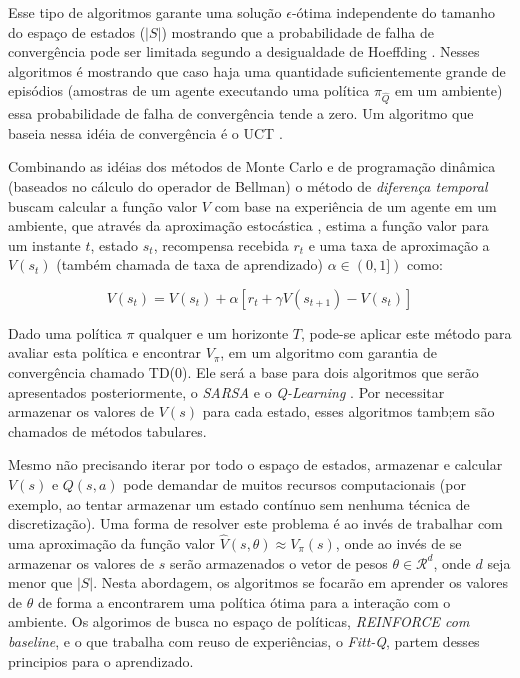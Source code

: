 \documentclass[letterpaper]{article}
\begin{document}

Esse tipo de algoritmos garante uma solução $\epsilon$-ótima independente do tamanho do espaço de estados ($|S|$) mostrando que a probabilidade de falha de convergência pode ser limitada segundo a desigualdade de Hoeffding \cite{Hoeffding-1994}. Nesses algoritmos é mostrando que caso haja uma quantidade suficientemente grande de episódios (amostras de um agente executando uma política $\pi_{\hat{Q}}$ em um ambiente) essa probabilidade de falha de convergência tende a zero. Um algoritmo que baseia nessa idéia de convergência é o UCT \cite{KocsisSzepesv-2006}.

Combinando as idéias dos métodos de Monte Carlo e de programação dinâmica (baseados no cálculo do operador de Bellman) o método de \textit{diferença temporal} buscam calcular a função valor $V$ com base na experiência de um agente em um ambiente, que através da aproximação estocástica \cite{RobbinsMonro-1951}, estima a função valor para um instante $t$, estado $s_t$, recompensa recebida $r_t$ e  uma taxa de aproximação a $V(s_t)$ (também chamada de taxa de aprendizado) $\alpha \in (0, 1])$ como:

\begin{equation} \label{eq:temporal_difference}
  V(s_t) = V(s_t) + \alpha [ r_t + \gamma V(s_{t+1}) - V(s_t) ]
\end{equation}

Dado uma política $\pi$ qualquer e um horizonte $T$, pode-se aplicar este método para avaliar esta política e encontrar $V_{\pi}$, em um algoritmo com garantia de convergência chamado \textsc{TD(0)}. Ele será a base para dois algoritmos que serão apresentados posteriormente, o \textit{SARSA} e o \textit{Q-Learning} \cite{Watkins-Dayan-1992}. Por necessitar armazenar os valores de $V(s)$ para cada estado, esses algoritmos tamb;em são chamados de métodos tabulares.

Mesmo não precisando iterar por todo o espaço de estados, armazenar e calcular $V(s)$ e $Q(s,a)$ pode demandar de muitos recursos computacionais (por exemplo, ao tentar armazenar um estado contínuo sem nenhuma técnica de discretização). Uma forma de resolver este problema é ao invés de trabalhar com uma aproximação da função valor $ \hat{V}(s, \theta) \approx V_{\pi}(s)$, onde ao invés de se armazenar os valores de $s$ serão armazenados o vetor de pesos $\theta \in \mathcal{R}^d$, onde $d$ seja menor que $|S|$. Nesta abordagem, os algoritmos se focarão em aprender os valores de $\theta$ de forma a encontrarem uma política ótima para a interação com o ambiente. Os algorimos de busca no espaço de políticas, \textit{REINFORCE com baseline}, e o que trabalha com reuso de experiências, o \textit{Fitt-Q}, partem desses principios para o aprendizado.
\end{document}
